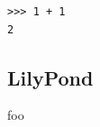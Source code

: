 \begin{singlespacing}
\vspace{-0.5\baselineskip}
\begin{lstlisting}
>>> 1 + 1
2
\end{lstlisting}
\end{singlespacing}

\subsection{LilyPond}

foo

\begin{singlespacing}
\vspace{-0.5\baselineskip}
\begin{multicols}{2}

\vfill
\columnbreak
\setlength\fboxsep{0pt}
\setlength\fboxrule{0.5pt}
\noindent{}
\end{multicols}
\end{singlespacing}

